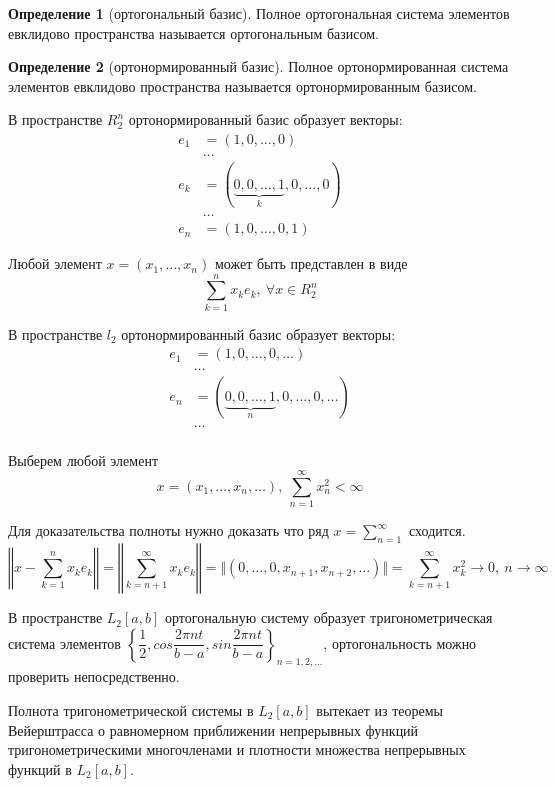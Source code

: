 \documentclass[14pt,a4paper]{extarticle}
\theoremstyle{definition}
\newtheorem{definition}{Определение}[section]
\theoremstyle{remark}
\renewcommand{\[}{\begin{dmath*}[compact]}
\renewcommand{\]}{\end{dmath*}}
\newcommand{\sep}{ , \ \allowbreak }
\newcommand\fr[2]{\dfrac{#1}{#2}}
\begin{document}
\begin{definition}[ортогональный базис]
  Полное ортогональная система элементов евклидово пространства
  называется ортогональным базисом.
\end{definition}

\begin{definition}[ортонормированный базис]
  Полное ортонормированная система элементов евклидово пространства
  называется ортонормированным базисом.
\end{definition}

В пространстве $R_2^n$ ортонормированный базис образует векторы:
\begin{align*}
  e_1&=(1,0,\dots,0) \\
  &\dots \\
  e_k&=(\underbrace{0,0,\dots,1}_k,0,\dots,0) \\
  &\dots \\
  e_n&=(1,0,\dots,0,1)
\end{align*}

Любой элемент $x=(x_1,\dots,x_n)$ может быть представлен в виде
\[\sum_{k=1}^n x_k e_k \sep {\forall x \in R_2^n}\]

В пространстве $l_2$ ортонормированный базис образует векторы:
\begin{align*}
  e_1&=(1,0,\dots,0,\dots) \\
  &\dots \\
  e_n&=(\underbrace{0,0,\dots,1}_n,0,\dots,0,\dots) \\
  &\dots \\
\end{align*}

Выберем любой элемент
\[x=(x_1,\dots,x_n,\dots) \sep \sum_{n=1}^\infty x_n^2 < \infty\]

Для доказательства полноты нужно доказать что ряд
$x = \sum_{n=1}^\infty$ сходится.
\[\left\Vert x - \sum_{k=1}^n x_k e_k \right\Vert \allowbreak
= \left\Vert \sum_{k=n+1}^\infty x_k e_k \right\Vert \allowbreak
= \Vert (0,\dots,0,x_{n+1}, x_{n+2},\dots) \Vert \allowbreak
= \sum_{k=n+1}^\infty x_k^2 \to 0 \sep {n \to \infty} \]

В пространстве $L_2[a,b]$ ортогональную систему образует
тригонометрическая система элементов
$\left\{ \fr{1}{2}, cos \fr{2 \pi n t}{b-a} ,
sin \fr{2 \pi nt}{b-a} \right\}_{n=1,2,\dots} $,
ортогональность можно проверить непосредственно.

Полнота тригонометрической системы в $L_2[a,b]$ вытекает из теоремы Вейерштрасса
о равномерном приближении непрерывных функций тригонометрическими многочленами и
плотности множества непрерывных функций в $L_2[a,b]$.
\end{document}
